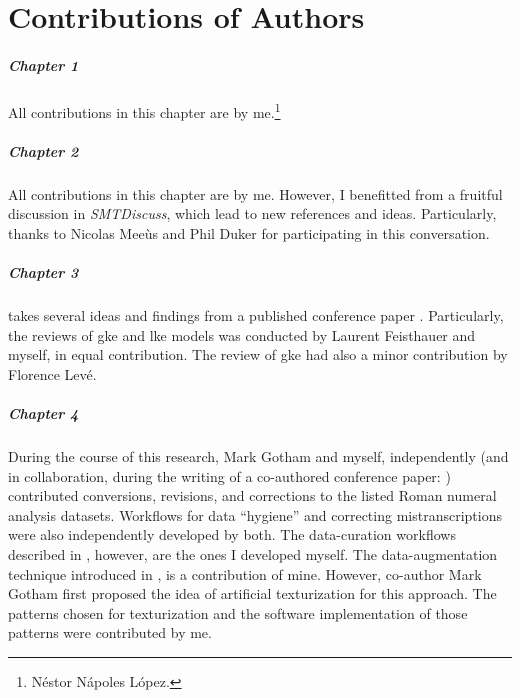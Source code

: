 \chapter*{Contributions of Authors}
\label{chap:contributionsofauthors}

\paragraph{Chapter 1}
All contributions in this chapter are by
me.\footnote{N\'estor N\'apoles L\'opez.}

\paragraph{Chapter 2}
All contributions in this chapter are by me. However, I
benefitted from a fruitful discussion in
\emph{SMTDiscuss},
which lead to new references and ideas. Particularly, thanks
to Nicolas Mee\`us and Phil Duker for participating in this
conversation.

\paragraph{Chapter 3} 
 takes several ideas and findings
from a published conference paper
\parencite{napoleslopez2020local}. Particularly, the reviews
of \gls{gke} and \gls{lke} models was conducted by Laurent
Feisthauer and myself, in equal contribution. The review of
\gls{gke} had also a minor contribution by Florence Lev\'e.

\paragraph{Chapter 4} 
During the course of this research, Mark Gotham and myself,
independently (and in collaboration, during the writing of a
co-authored conference paper:
\cite{napoleslopez2021augmentednet}) contributed
conversions, revisions, and corrections to the listed Roman
numeral analysis datasets. Workflows for data ``hygiene''
and correcting mistranscriptions were also independently
developed by both. The data-curation workflows described in
, however, are the ones
I developed myself. The data-augmentation technique
introduced in
, is a
contribution of mine. However, co-author Mark Gotham first
proposed the idea of artificial texturization for this
approach. The patterns chosen for texturization and the
software implementation of those patterns were contributed
by me.

